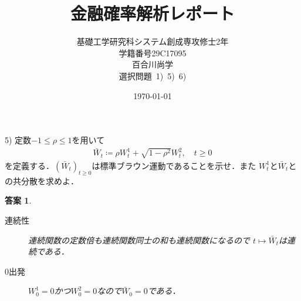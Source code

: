 \documentclass[11pt,a4paper]{jsarticle}
\title{金融確率解析レポート}
\author{基礎工学研究科システム創成専攻修士2年\\学籍番号29C17095\\百合川尚学\\選択問題\ 1)\ 5)\ 6)}
\date{\today}
\theoremstyle{mystyle}
\newtheorem*{ans}{答案}
\begin{document}
\maketitle

\begin{itembox}[l]{5)}
	定数$-1 \leq \rho \leq 1$を用いて
	\begin{align}
		\bar{W}_{t} \coloneqq \rho W^{1}_{t} + \sqrt{1-\rho^{2}} W^{2}_{t},
		\quad t \geq 0
	\end{align}
	を定義する．$(\bar{W}_{t})_{t \geq 0}$は標準ブラウン運動であることを示せ．また
	$W^{1}_{t}$と$\bar{W}_{t}$との共分散を求めよ．
\end{itembox}

\begin{ans}\mbox{}
	\begin{description}
		\item[連続性]
			連続関数の定数倍も連続関数同士の和も連続関数になるので
			$t \longmapsto \bar{W}_{t}$は連続である．
			
		\item[$0$出発]
			$W^{1}_{0} = 0$かつ$W^{2}_{0} = 0$なので$\bar{W}_{0} = 0$である．
			

\end{description}
\end{ans}
\end{document}
